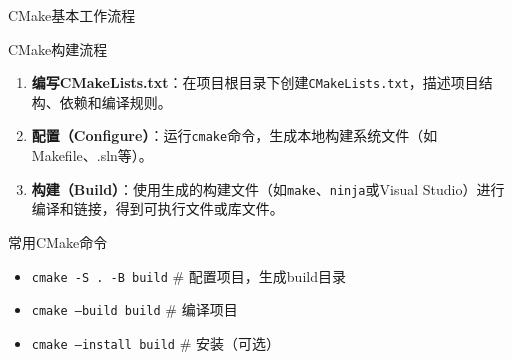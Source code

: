 \documentclass[UTF8,aspectratio=169]{beamer}
\begin{document}
\begin{frame}[fragile]{CMake基本工作流程}
    \begin{ytublock}{CMake构建流程}
        \begin{enumerate}
            \item \textbf{编写CMakeLists.txt}：在项目根目录下创建\texttt{CMakeLists.txt}，描述项目结构、依赖和编译规则。
            \item \textbf{配置（Configure）}：运行\texttt{cmake}命令，生成本地构建系统文件（如Makefile、.sln等）。
            \item \textbf{构建（Build）}：使用生成的构建文件（如\texttt{make}、\texttt{ninja}或Visual Studio）进行编译和链接，得到可执行文件或库文件。
        \end{enumerate}
    \end{ytublock}

    \begin{ytublock}{常用CMake命令}
        \begin{itemize}
            \item \texttt{cmake -S . -B build} \hspace{1em} \# 配置项目，生成build目录
            \item \texttt{cmake --build build} \hspace{1em} \# 编译项目
            \item \texttt{cmake --install build} \hspace{1em} \# 安装（可选）
        \end{itemize}
    \end{ytublock}
\end{frame}
\end{document}

